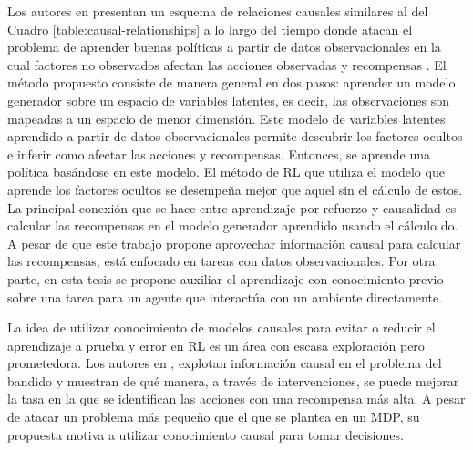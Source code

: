 Los autores en \cite{lu2018deconfounding} presentan un esquema de relaciones causales similares al del Cuadro \ref{table:causal-relationships} a lo largo del tiempo donde atacan el problema de aprender buenas políticas a partir de datos observacionales en la cual factores no observados afectan las acciones observadas y recompensas \cite{pearl_2009}. El método propuesto consiste de manera general en dos pasos: aprender un modelo generador \cite{jebara2012machine} sobre un espacio de variables latentes, es decir, las observaciones son mapeadas a un espacio de menor dimensión.  Este modelo de variables latentes aprendido a partir de datos observacionales permite descubrir los factores ocultos e inferir como afectar las acciones y recompensas. Entonces, se aprende una política basándose en este modelo. 
El método de RL que utiliza el modelo que aprende los factores ocultos se desempeña mejor que aquel sin el cálculo de estos. La principal conexión que se hace entre aprendizaje por refuerzo y causalidad es calcular las recompensas en el modelo generador aprendido usando el cálculo do. A pesar de que este trabajo propone aprovechar información causal para calcular las recompensas, está enfocado en tareas con datos observacionales. Por otra parte, en esta tesis se propone auxiliar el aprendizaje con conocimiento previo sobre una tarea para un agente que interactúa con un ambiente directamente.

La idea de utilizar conocimiento de modelos
causales para evitar o reducir el aprendizaje a 
prueba y error en RL es un área con escasa 
exploración pero prometedora.
Los autores en \cite{lattimore2016causal},
explotan información causal en el problema
del bandido y muestran de qué manera, a través
de intervenciones, se puede mejorar la
tasa en la que se identifican las acciones
con una recompensa más alta. A pesar de atacar un problema más pequeño
que el que se plantea en un MDP, su propuesta motiva a utilizar 
conocimiento causal para tomar decisiones.


